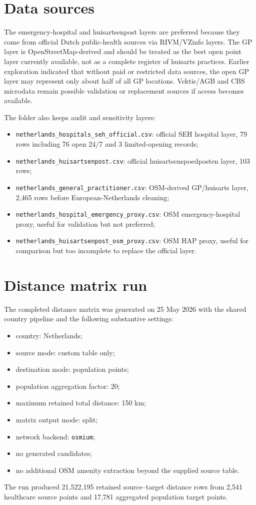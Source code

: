 \documentclass[11pt]{article}
\begin{document}
\section*{Data sources}
The emergency-hospital and huisartsenpost layers are preferred because they come from official Dutch public-health sources via RIVM/VZinfo layers. The GP layer is OpenStreetMap-derived and should be treated as the best open point layer currently available, not as a complete register of huisarts practices. Earlier exploration indicated that without paid or restricted data sources, the open GP layer may represent only about half of all GP locations. Vektis/AGB and CBS microdata remain possible validation or replacement sources if access becomes available.

The folder also keeps audit and sensitivity layers:
\begin{itemize}[leftmargin=*]
  \item \texttt{netherlands\_hospitals\_seh\_official.csv}: official SEH hospital layer, 79 rows including 76 open 24/7 and 3 limited-opening records;
  \item \texttt{netherlands\_huisartsenpost.csv}: official huisartsenspoedposten layer, 103 rows;
  \item \texttt{netherlands\_general\_practitioner.csv}: OSM-derived GP/huisarts layer, 2,465 rows before European-Netherlands cleaning;
  \item \texttt{netherlands\_hospital\_emergency\_proxy.csv}: OSM emergency-hospital proxy, useful for validation but not preferred;
  \item \texttt{netherlands\_huisartsenpost\_osm\_proxy.csv}: OSM HAP proxy, useful for comparison but too incomplete to replace the official layer.
\end{itemize}

\section*{Distance matrix run}
The completed distance matrix was generated on 25 May 2026 with the shared country pipeline and the following substantive settings:
\begin{itemize}[leftmargin=*]
  \item country: Netherlands;
  \item source mode: custom table only;
  \item destination mode: population points;
  \item population aggregation factor: 20;
  \item maximum retained total distance: 150 km;
  \item matrix output mode: split;
  \item network backend: \texttt{osmium};
  \item no generated candidates;
  \item no additional OSM amenity extraction beyond the supplied source table.
\end{itemize}
The run produced 21,522,195 retained source--target distance rows from 2,541 healthcare source points and 17,781 aggregated population target points.
\end{document}
